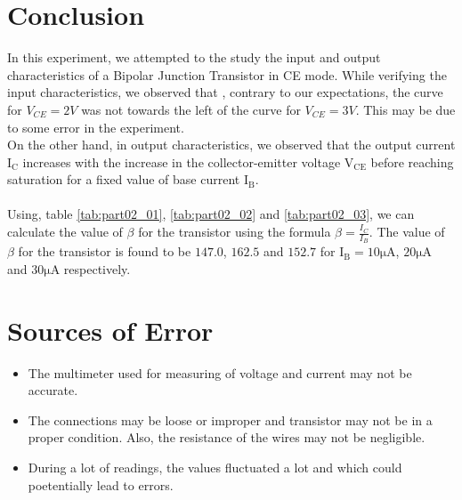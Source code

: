 \documentclass[12pt]{article}
\begin{document}
\section{Conclusion}
In this experiment, we attempted to the study the input and output characteristics of a Bipolar Junction Transistor in CE mode. While verifying the input characteristics, we observed that , contrary to our expectations, the curve for $V_{CE}=2V$ was not towards the left of the curve for $V_{CE}=3V$. This may be due to some error in the experiment. \\
On the other hand, in output characteristics, we observed that the output current $\mathrm{I_C}$ increases with the increase in the collector-emitter voltage $\mathrm{V_{CE}}$ before reaching saturation for a fixed value of base current $\mathrm{I_B}$.\\
\\
Using, table \ref{tab:part02_01}, \ref{tab:part02_02} and \ref{tab:part02_03}, we can calculate the value of $\beta$ for the transistor using the formula $\beta = \frac{I_C}{I_B}$.
The value of $\beta$ for the transistor is found to be $147.0$, $162.5$ and $152.7$ for $\mathrm{I_B}=10 \mathrm{\mu A}$, $\mathrm{20 \mu A}$ and $\mathrm{30 \mu A}$ respectively.
\section{Sources of Error}
\begin{itemize}
    \item The multimeter used for measuring of voltage and current may not be accurate.
    \item The connections may be loose or improper and transistor may not be in a proper condition. Also, the resistance of the wires may not be negligible.
    \item During a lot of readings, the values fluctuated a lot and which could poetentially lead to errors.
\end{itemize}

 
\end{document}

